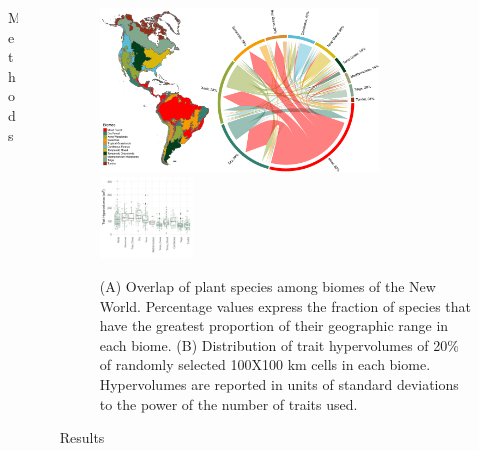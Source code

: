 \documentclass[final]{beamer}
\newlength{\sepwid}
\newlength{\onecolwid}
\newlength{\twocolwid}
\begin{document}
\begin{frame}[t]
\begin{columns}[t]
\begin{column}{\onecolwid}
\begin{block}{Methods}
	\end{block}

    \end{column}


    \begin{column}{\sepwid}\end{column}			%
    \begin{column}{\twocolwid}							%

\begin{figure}[h]
	\centering
	\includegraphics[width=0.75\textwidth]{./figures/Figure1.pdf}
	~
	\includegraphics[width=0.25\textwidth]{./figures/Hypervolume_sp_sample_gaussian20perc.pdf}
	\caption{(A) Overlap of plant species among biomes of the New World. Percentage values express the fraction of species that have the greatest proportion of their geographic range in each biome. (B) Distribution of trait hypervolumes of 20\% of randomly selected 100X100 km cells in each biome. Hypervolumes are reported in units of standard deviations to the power of the number of traits used.}
	\label{fig:map}
\end{figure}



\begin{block}{Results}


		 
\begin{multicols}{2}


\end{multicols}
\end{block}
\end{column}
\end{columns}
\end{frame}
\end{document}
